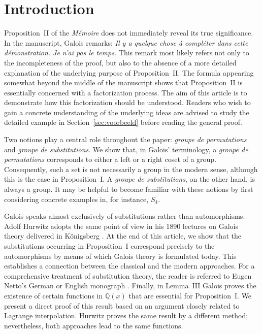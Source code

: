 \documentclass[a4paper,11pt]{article}
\begin{document}
\section{Introduction}

Proposition~II of the \textit{Mémoire} does not immediately reveal its true significance. In the manuscript, Galois remarks: \textit{Il y a quelque chose à compléter dans cette démonstration. Je n'ai pas le temps.} This remark most likely refers not only to the incompleteness of the proof, but also to the absence of a more detailed explanation of the underlying purpose of Proposition~II. The formula appearing somewhat beyond the middle of the manuscript shows that Proposition~II is essentially concerned with a factorization process. The aim of this article is to demonstrate how this factorization should be understood. Readers who wish to gain a concrete understanding of the underlying ideas are advised to study the detailed example in Section~\ref{sec:voorbeeld} before reading the general proof.

Two notions play a central role throughout the paper: \textit{groupe de permutations} and \textit{groupe de substitutions}. We show that, in Galois' terminology, a \textit{groupe de permutations} corresponds to either a left or a right coset of a group. Consequently, such a set is not necessarily a group in the modern sense, although this is the case in Proposition~I. A \textit{groupe de substitutions}, on the other hand, is always a group. It may be helpful to become familiar with these notions by first considering concrete examples in, for instance, \(S_4\).

Galois speaks almost exclusively of substitutions rather than automorphisms. Adolf Hurwitz adopts the same point of view in his 1890 lectures on Galois theory delivered in Königsberg \cite{Hurwitz1}. At the end of this article, we show that the substitutions occurring in Proposition~I correspond precisely to the automorphisms by means of which Galois theory is formulated today. This establishes a connection between the classical and the modern approaches. For a comprehensive treatment of substitution theory, the reader is referred to Eugen Netto's German or English monograph \cite{netto}. Finally, in Lemma~III Galois proves the existence of certain functions in \(\mathbb{Q}(x)\) that are essential for Proposition~I. We present a direct proof of this result based on an argument closely related to Lagrange interpolation. Hurwitz proves the same result by a different method; nevertheless, both approaches lead to the same functions.
\end{document}
